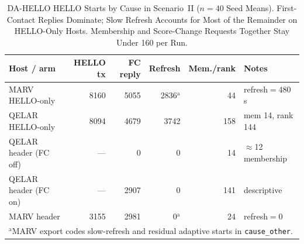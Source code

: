 \begin{table}[!t]
\caption{DA-HELLO HELLO Starts by Cause in Scenario~II ($n=40$ Seed Means).
First-Contact Replies Dominate; Slow Refresh Accounts for Most of the
Remainder on HELLO-Only Hosts. Membership and Score-Change Requests
Together Stay Under 160 per Run.}
\label{tab:causes}
\centering
\scriptsize
\setlength{\tabcolsep}{5pt}
\begin{tabular*}{\textwidth}{@{\extracolsep{\fill}}lrrrrp{}@{}}
\hline
Host / arm & HELLO tx & FC reply & Refresh & Mem./rank & Notes \\
\hline
MARV HELLO-only & 8160 & 5055 & 2836$^{\mathrm{a}}$ & 44 & refresh$=$480\,s \\
QELAR HELLO-only & 8094 & 4679 & 3742 & 158 & mem 14, rank 144 \\
QELAR header (FC off) & --- & 0 & 0 & 14 & $\approx$12 membership \\
QELAR header (FC on) & --- & 2907 & 0 & 141 & descriptive \\
MARV header & 3155 & 2981 & 0$^{\mathrm{a}}$ & 24 & refresh$=$0 \\
\hline
\multicolumn{6}{l}{\footnotesize $^{\mathrm{a}}$MARV export codes slow-refresh and residual adaptive starts in \texttt{cause\_other}.}\\
\end{tabular*}
\end{table}
